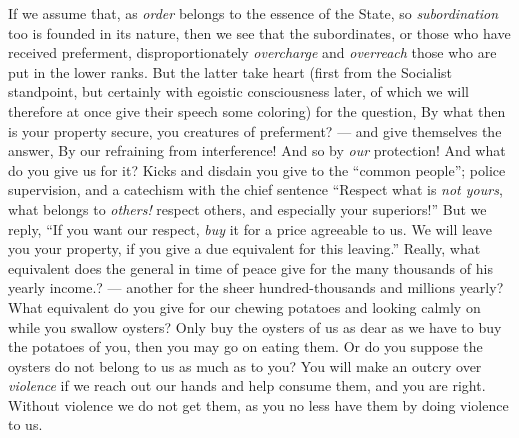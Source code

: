 If we assume that, as \textit{order} belongs to the essence of the State, so 
\textit{subordination} too is founded in its nature, then we see that the 
subordinates, or those who have received preferment, disproportionately 
\textit{overcharge} and \textit{overreach} those who are put in the lower 
ranks. But the latter take heart (first from the Socialist standpoint, but 
certainly with egoistic consciousness later, of which we will therefore at 
once give their speech some coloring) for the question, By what then is your 
property secure, you creatures of preferment? --- and give themselves the 
answer, By our refraining from interference! And so by \textit{our} 
protection! And what do you give us for it? Kicks and disdain you give to the 
``common people''; police supervision, and a catechism with the chief 
sentence ``Respect what is \textit{not yours}, what belongs to 
\textit{others!} respect others, and especially your superiors!'' But we 
reply, ``If you want our respect, \textit{buy} it for a price agreeable to 
us. We will leave you your property, if you give a due equivalent for this 
leaving.'' Really, what equivalent does the general in time of peace give for 
the many thousands of his yearly income.? --- another for the sheer 
hundred-thousands and millions yearly? What equivalent do you give for our 
chewing potatoes and looking calmly on while you swallow oysters? Only buy the 
oysters of us as dear as we have to buy the potatoes of you, then you may go 
on eating them. Or do you suppose the oysters do not belong to us as much as 
to you? You will make an outcry over \textit{violence} if we reach out our 
hands and help consume them, and you are right. Without violence we do not get 
them, as you no less have them by doing violence to us.

